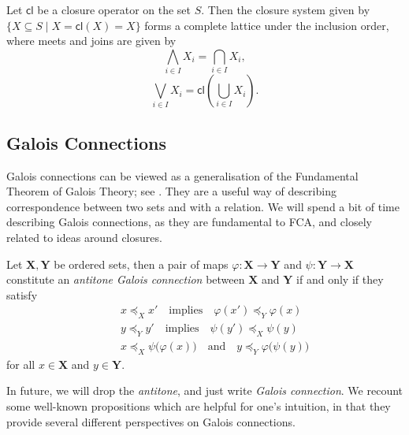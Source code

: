 \begin{theorem}
	\label{theorem:closure-systems-lattices}

	Let $\mathsf{cl}$ be a closure operator on the set $S$. Then the closure system given by $\{X \subseteq S \mid X = \mathsf{cl}
	(X) = X \}$ forms a complete lattice under the inclusion order, where meets and joins are given by
	\[
		\underset{i \in I}\bigwedge X_{i}= \underset{i \in I}\bigcap X_{i},
	\]
	\[
		\underset{i \in I}\bigvee X_{i}= \mathsf{cl}(\underset{i \in I}\bigcup X_{i}).
	\]
\end{theorem}

\subsection{Galois Connections}
\label{subsection:galois-connections}

Galois connections can be viewed as a generalisation of the Fundamental Theorem of Galois Theory; see
\cite{bergman2015invitation}. They are a useful way of describing correspondence between two sets and with a relation.
We will spend a bit of time describing Galois connections, as they are fundamental to FCA, and closely related to ideas
around closures.

\begin{definition}
	 \label{definition:Galois-connection-1} Let $\mathbf{X}, \mathbf{Y}$ be ordered sets, then a
	pair of maps $\varphi \colon \mathbf{X}\to \mathbf{Y}$ and $\psi \colon \mathbf{Y}\to \mathbf{X}$ constitute an \emph{antitone
	Galois connection} between $\mathbf{X}$ and $\mathbf{Y}$ if and only if they satisfy
	\begin{align}
		\quad & x \preceq_{X}x' \quad \text{implies}\quad \varphi (x') \preceq_{Y}\varphi (x) \label{equation:ord_galois-1}                         \\
		\quad & y \preceq_{Y}y' \quad \text{implies}\quad \psi (y') \preceq_{X}\psi (y) \label{equation:ord-galois-2}                               \\
		\quad & x \preceq_{X}\psi \big(\varphi (x)\big) \quad \text{and}\quad y \preceq_{Y}\varphi \big(\psi (y)\big) \label{equation:ord-galois-3}
	\end{align}
	for all $x \in \mathbf{X}$ and $y \in \mathbf{Y}$.
\end{definition}

In future, we will drop the \textit{antitone}, and just write \textit{Galois connection}. We recount some well-known
propositions which are helpful for one's intuition, in that they provide several different perspectives on Galois connections.

